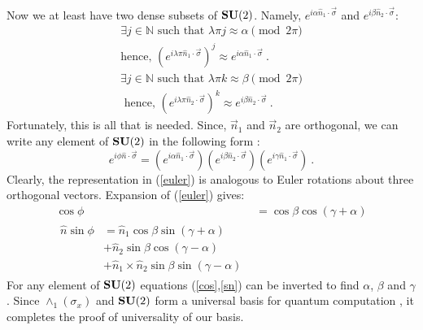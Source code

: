 \documentclass[twocolumn,11pt]{article}
\begin{document}
Now we at least have two dense subsets of $\mbox{\bf SU}(2)$. Namely,
$e^{i\alpha\hat{n}_1 \cdot \vec{\sigma}}$ and $e^{i\beta\hat{n}_2 \cdot
\vec{\sigma}}$: 
\begin{equation} \begin{split} \exists j \in \mathbb N \text{ such that }\lambda\pi j
\approx \alpha \pmod{2\pi} \\ \text{hence, } (e^{i\lambda\pi\hat{n}_1 \cdot
\vec{\sigma}})^j\approx e^{i\alpha\hat{n}_1 \cdot \vec{\sigma}}\ .
\end{split} \end{equation} 
\begin{equation} \begin{split} \exists j \in \mathbb N \text{ such that }
\lambda\pi k \approx \beta \pmod{2\pi}\\ \text{ hence, } (e^{i\lambda\pi\hat{n}_2 \cdot
\vec{\sigma}})^k\approx e^{i\beta\hat{n}_2 \cdot \vec{\sigma}} \ .
\end{split} 
\end{equation} 
Fortunately, this is all that is needed.
Since, $\vec{n}_1$ and $\vec{n}_2$ are orthogonal, we can write any
element of $\mbox{\bf SU}(2)$ in the following form \cite{SU2rep}:
\begin{equation}\label{euler} e^{i\phi\hat{n} \cdot
\vec{\sigma}}=(e^{i\alpha\hat{n}_1 \cdot \vec{\sigma}})
(e^{i\beta\hat{n}_2 \cdot \vec{\sigma}}) (e^{i\gamma\hat{n}_1 \cdot
\vec{\sigma}}) \ .\end{equation} 
Clearly, the representation in (\ref{euler}) is
analogous to Euler rotations about three orthogonal vectors. Expansion
of (\ref{euler}) gives: 
\begin{equation} \begin{align}
\cos\phi&=\cos\beta\cos(\gamma+\alpha)\label{cos}\\
\begin{split}\label{sn}
\hat{n}\sin\phi&=\hat{n}_1\cos\beta\sin(\gamma+\alpha)\\
&+\hat{n}_2\sin\beta\cos(\gamma-\alpha)\\
&+\hat{n}_1\times\hat{n}_2\sin\beta\sin(\gamma-\alpha) \end{split}
\end{align} 
\end{equation} 
For any element of $\mbox{\bf SU}(2)$ equations
(\ref{cos},\ref{sn}) can be inverted to find $\alpha$, $\beta$ and
$\gamma$. Since $\wedge_1(\sigma_x)$ and $\mbox{\bf SU}(2)$ form a universal
basis
for quantum computation \cite{egfqc}, it completes the proof
of universality of our basis.
\end{document}
